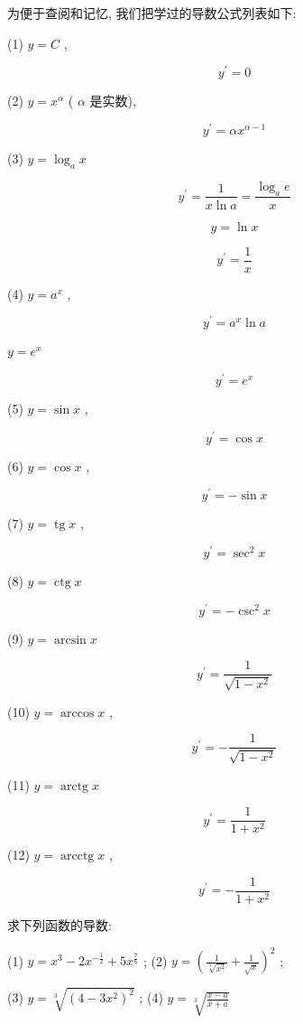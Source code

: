 \documentclass[lang=cn,newtx,10pt,scheme=chinese]{elegantbook}
\begin{document}
为便于查阅和记忆, 我们把学过的导数公式列表如下:

(1) \(y = C\) ,

\[
{y}^{\prime } = 0
\]

(2) \(y = {x}^{\alpha }\) ( \(\alpha\) 是实数),

\[
{y}^{\prime } = \alpha {x}^{\alpha - 1}
\]

(3) \(y = {\log }_{a}x\)

\[
{y}^{\prime } = \frac{1}{x\ln a} = \frac{{\log }_{a}e}{x}
\]

\[
y = \ln x
\]

\[
{y}^{\prime } = \frac{1}{x}
\]

(4) \(y = {a}^{x}\) ,

\[
{y}^{\prime } = {a}^{x}\ln a
\]

\(y = {e}^{x}\)

\[
{y}^{\prime } = {e}^{x}
\]

(5) \(y = \sin x\) ,

\[
{y}^{\prime } = \cos x
\]

(6) \(y = \cos x\) ,

\[
{y}^{\prime } = - \sin x
\]

(7) \(y = \operatorname{tg}x\) ,

\[
{y}^{\prime } = {\sec }^{2}x
\]

(8) \(y = \operatorname{ctg}x\)

\[
{y}^{\prime } = - {\csc }^{2}x
\]

(9) \(y = \arcsin x\)

\[
{y}^{\prime } = \frac{1}{\sqrt{1 - {x}^{2}}}
\]

(10) \(y = \arccos x\) ,

\[
{y}^{\prime } = - \frac{1}{\sqrt{1 - {x}^{2}}}
\]

(11) \(y = \operatorname{arctg}x\)

\[
{y}^{\prime } = \frac{1}{1 + {x}^{2}}
\]

(12) \(y = \operatorname{arcctg}x\) ,

\[
{y}^{\prime } = - \frac{1}{1 + {x}^{2}}
\]

\begin{problemset}[练习]

\item 求下列函数的导数:

(1) \(y = {x}^{3} - 2{x}^{-\frac{1}{2}} + 5{x}^{\frac{7}{6}}\) ; (2) \(y = {\left( \frac{1}{\sqrt[3]{{x}^{2}}} + \frac{1}{\sqrt{x}}\right) }^{2}\) ;

(3) \(y = \sqrt[3]{{\left( 4 - 3{x}^{2}\right) }^{2}}\) ; (4) \(y = \sqrt[3]{\frac{x - a}{x + a}}\)

\end{problemset}
\end{document}
